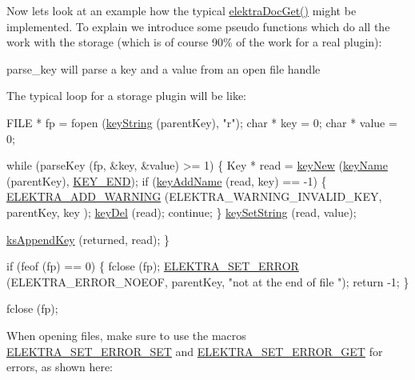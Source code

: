 Now lets look at an example how the typical \hyperlink{group__plugin_gacb69f3441c6d84241b4362f958fbe313}{elektra\+Doc\+Get()} might be implemented. To explain we introduce some pseudo functions which do all the work with the storage (which is of course 90\% of the work for a real plugin)\+:
\begin{DoxyItemize}
\item parse\+\_\+key will parse a key and a value from an open file handle
\end{DoxyItemize}

The typical loop for a storage plugin will be like\+:


\begin{DoxyCodeInclude}
        FILE * fp = fopen (\hyperlink{group__keyvalue_ga880936f2481d28e6e2acbe7486a21d05}{keyString} (parentKey), \textcolor{stringliteral}{"r"});
        \textcolor{keywordtype}{char} * key = 0;
        \textcolor{keywordtype}{char} * value = 0;

        \textcolor{keywordflow}{while} (parseKey (fp, &key, &value) >= 1)
        \{
                Key * read = \hyperlink{group__key_gad23c65b44bf48d773759e1f9a4d43b89}{keyNew} (\hyperlink{group__keyname_ga8e805c726a60da921d3736cda7813513}{keyName} (parentKey), \hyperlink{group__key_gga91fb3178848bd682000958089abbaf40aa8adb6fcb92dec58fb19410eacfdd403}{KEY\_END});
                \textcolor{keywordflow}{if} (\hyperlink{group__keyname_gaa70593a2c772c4b7bc33423b9b10a270}{keyAddName} (read, key) == -1)
                \{
                        \hyperlink{group__plugin_ga3da3bdb0f41710adda9eee3d7adac9ff}{ELEKTRA\_ADD\_WARNING} (ELEKTRA\_WARNING\_INVALID\_KEY, parentKey, key
      );
                        \hyperlink{group__key_ga3df95bbc2494e3e6703ece5639be5bb1}{keyDel} (read);
                        \textcolor{keywordflow}{continue};
                \}
                \hyperlink{group__keyvalue_ga622bde1eb0e0c4994728331326340ef2}{keySetString} (read, value);

                \hyperlink{group__keyset_gaa5a1d467a4d71041edce68ea7748ce45}{ksAppendKey} (returned, read);
        \}

        \textcolor{keywordflow}{if} (feof (fp) == 0)
        \{
                fclose (fp);
                \hyperlink{group__plugin_gaab1842b82272e6d4235b6a71587a64d9}{ELEKTRA\_SET\_ERROR} (ELEKTRA\_ERROR\_NOEOF, parentKey, \textcolor{stringliteral}{"not at the end of file
      "});
                \textcolor{keywordflow}{return} -1;
        \}

        fclose (fp);
\end{DoxyCodeInclude}
 When opening files, make sure to use the macros \hyperlink{group__plugin_gaf526686f01dbacd68671732aad4b5d76}{E\+L\+E\+K\+T\+R\+A\+\_\+\+S\+E\+T\+\_\+\+E\+R\+R\+O\+R\+\_\+\+S\+ET} and \hyperlink{group__plugin_ga2f5d331ed725c6af0c511a0aa8677daa}{E\+L\+E\+K\+T\+R\+A\+\_\+\+S\+E\+T\+\_\+\+E\+R\+R\+O\+R\+\_\+\+G\+ET} for errors, as shown here\+:


